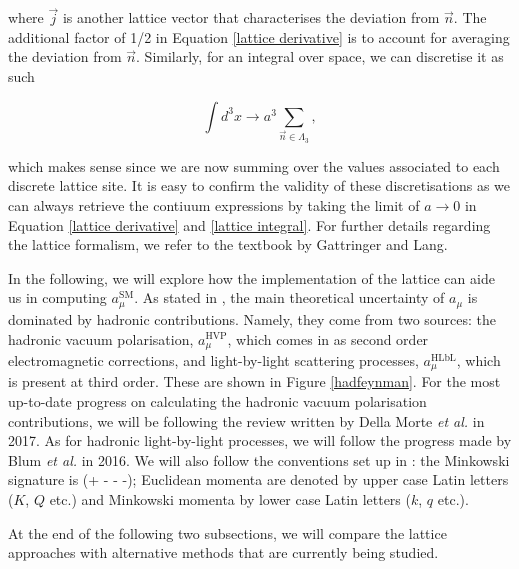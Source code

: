 \documentclass{article}
\numberwithin{equation}{section} %
\begin{document}
\noindent where $\vec{j}$ is another lattice vector that characterises the deviation from $\vec{n}$. The additional factor of 1/2 in Equation \ref{lattice derivative} is to account for averaging the deviation from $\vec{n}$. Similarly, for an integral over space, we can discretise it as such

\begin{equation}
\int d^3x \rightarrow a^3\sum_{\vec{n}\in\Lambda_3},
\label{lattice integral}
\end{equation}

\noindent which makes sense since we are now summing over the values associated to each discrete lattice site. It is easy to confirm the validity of these discretisations as we can always retrieve the contiuum expressions by taking the limit of $a\rightarrow 0$ in Equation \ref{lattice derivative} and \ref{lattice integral}. For further details regarding the lattice formalism, we refer to the textbook by Gattringer and Lang\cite{lattice}.

In the following, we will explore how the implementation of the lattice can aide us in computing $a_\mu^\mathrm{SM}$. As stated in \cite{lehnerg2}, the main theoretical uncertainty of $a_\mu$ is dominated by hadronic contributions. Namely, they come from two sources: the hadronic vacuum polarisation, $a_\mu^\mathrm{HVP}$, which comes in as second order electromagnetic corrections, and light-by-light scattering  processes, $a_\mu^\mathrm{HLbL}$, which is present at third order. These are shown in Figure \ref{hadfeynman}. For the most up-to-date progress on calculating the hadronic vacuum polarisation contributions, we will be following the review written by Della Morte \textit{et al.}\cite{dellamorte} in 2017. As for hadronic light-by-light processes, we will follow the progress made by Blum \textit{et al.}\cite{blum} in 2016. We will also follow the conventions set up in \cite{vector}: the Minkowski signature is (+ - - -); Euclidean momenta are denoted by upper case Latin letters ($K$, $Q$ etc.) and Minkowski momenta by lower case Latin letters ($k$, $q$ etc.).

At the end of the following two subsections, we will compare the lattice approaches with alternative methods that are currently being studied.
\end{document}

